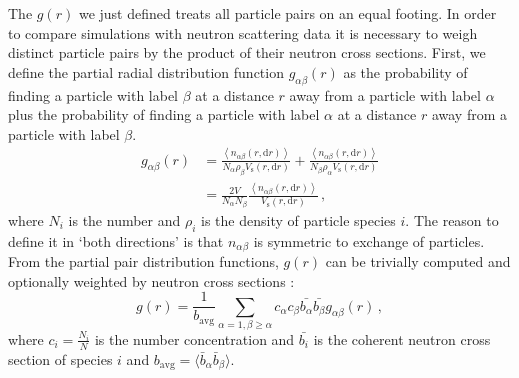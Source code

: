 The $g(r)$ we just defined treats all particle pairs on an equal footing. In order to compare simulations with neutron scattering data it is necessary to weigh distinct particle pairs by the product of their neutron cross sections. First, we define the partial radial distribution function $g_{\alpha\beta}(r)$ as the probability of finding a particle with label $\beta$ at a distance $r$ away from a particle with label $\alpha$ plus the probability of finding a particle with label $\alpha$ at a distance $r$ away from a particle with label $\beta$.
%
\begin{align*}
g_{\alpha\beta}(r) &= \frac{ \left\langle n_{\alpha\beta}(r,\mathrm{d}r) \right\rangle}{N_\alpha  \rho_\beta V_\text{s}(r,\mathrm{d}r)} + \frac{ \left\langle n_{\alpha\beta}(r,\mathrm{d}r) \right\rangle}{N_\beta \rho_\alpha V_\text{s}(r,\mathrm{d}r)} \\
&= \frac{2V}{N_\alpha N_\beta} \frac{ \left\langle n_{\alpha\beta}(r,\mathrm{d}r) \right\rangle}{V_\text{s}(r,\mathrm{d}r)} \, ,
\end{align*}
%
where $N_i$ is the number and $\rho_i$ is the density of particle species $i$. The reason to define it in `both directions' is that $n_{\alpha\beta}$ is symmetric to exchange of particles. From the partial pair distribution functions, $g(r)$ can be trivially computed and optionally weighted by neutron cross sections :
%
\[ g(r) = \frac{1}{b_\text{avg}} \sum_{\alpha=1,\beta\geq\alpha} c_\alpha c_\beta \bar{b_\alpha} \bar{b_\beta} g_{\alpha\beta}(r) \, , \]
%
where $c_i = \frac{N_i}{N}$ is the number concentration and $\bar{b_i}$ is the coherent neutron cross section of species $i$ and $b_\text{avg} = \langle \bar{b}_\alpha \bar{b}_\beta \rangle$.
%

